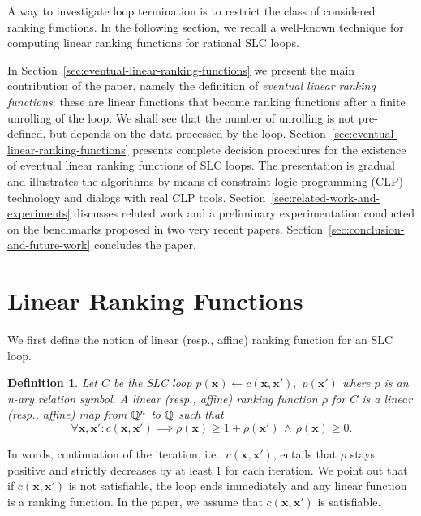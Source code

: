 \documentclass{acm_proc_article-sp}
\newtheorem{definition}[theorem]{Definition}
\newcommand{\itc}{\mathrel{:}}
\begin{document}
A way to investigate loop termination is to restrict the class of
considered ranking functions.
In the following section, we recall a well-known technique
for computing linear ranking functions for rational SLC loops.

In Section~\ref{sec:eventual-linear-ranking-functions}
we present the main contribution of the paper,
namely the definition of \emph{eventual linear ranking functions}:
these are linear functions that become
ranking functions after a finite unrolling of the loop.
We shall see that the number of unrolling is not pre-defined, but
depends on the data processed by the loop.
Section~\ref{sec:eventual-linear-ranking-functions} presents
complete decision procedures for the existence of
eventual linear ranking functions of SLC loops.  The presentation is
gradual and illustrates the algorithms by means
of constraint logic programming (CLP) technology and dialogs with real
CLP tools.
Section~\ref{sec:related-work-and-experiments} discusses related
work and a preliminary experimentation conducted on the benchmarks
proposed in two very recent papers.
Section~\ref{sec:conclusion-and-future-work} concludes the paper.


\section{Linear Ranking Functions}
\label{sec:linear-ranking-functions}

We first define the notion of linear (resp., affine) ranking function
for an SLC loop.

\begin{definition}
\label{def-fn-rng-lin}
Let $C$ be the SLC loop
$p(\mathbf{x}) \leftarrow c(\mathbf{x}, \mathbf{x}'),$ $p(\mathbf{x}')$
where $p$ is an n-ary relation symbol.
A \emph{linear} (resp., \emph{affine}) \emph{ranking function} $\rho$ for $C$
is a linear (resp., affine) map from $\mathbb{Q}^n$ to $\mathbb{Q}$ such that
\[
   \forall \mathbf{x}, \mathbf{x}'
     \itc c(\mathbf{x}, \mathbf{x}')
            \implies
              \rho(\mathbf{x}) \ge 1 + \rho(\mathbf{x}')
              \,\land\,
              \rho(\mathbf{x}) \ge 0.
\]
\end{definition}

In words, continuation of the iteration, i.e., $c(\mathbf{x}, \mathbf{x}')$,
entails that $\rho$ stays positive and strictly decreases by at least $1$
for each iteration.
We point out that if $c(\mathbf{x}, \mathbf{x}')$ is not satisfiable,
the loop ends immediately and any linear function is a ranking
function.
In the paper, we assume that $c(\mathbf{x}, \mathbf{x}')$ is
satisfiable.
\end{document}
